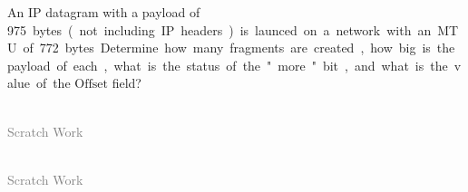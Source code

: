 \documentclass[12pt,addpoints,answers]{exam}
\begin{document}
\begin{questions}
\question[5] An IP datagram with a payload of \SI{975} bytes (not including IP headers) is launced on a network with an MTU of \SI{772}{bytes}. Determine how many fragments are created, how big is the payload of each, what is the status of the "more" bit, and what is the value of the $\mathrm{Offset}$ field?
\begin{solution}[10em]
\end{solution}
\vfill

\end{questions}

\newpage
\begin{center}\hrulefill\\\textcolor{gray}{Scratch Work}\end{center}
\vfill

\newpage
\begin{center}\hrulefill\\\textcolor{gray}{Scratch Work}\end{center}
\vfill
\begin{center}\gradetable[v][questions]\end{center}
\end{document}
